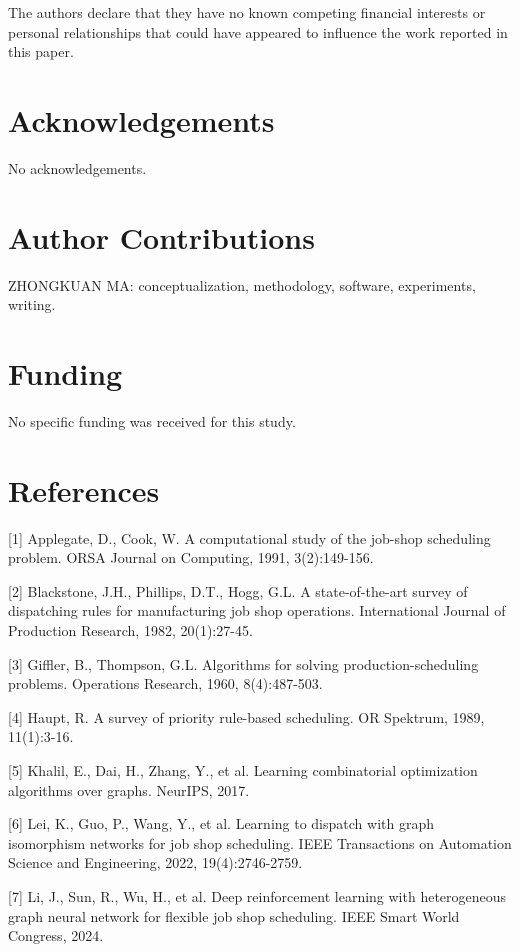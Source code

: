 \documentclass{article}
\begin{document}
The authors declare that they have no known competing financial interests or personal relationships that could have appeared to influence the work reported in this paper.


\section*{Acknowledgements}

No acknowledgements.


\section*{Author Contributions}

ZHONGKUAN MA: conceptualization, methodology, software, experiments, writing.


\section*{Funding}

No specific funding was received for this study.


\section*{References}

{[}1{]} Applegate, D., Cook, W. A computational study of the job-shop scheduling problem. ORSA Journal on Computing, 1991, 3(2):149-156.

{[}2{]} Blackstone, J.H., Phillips, D.T., Hogg, G.L. A state-of-the-art survey of dispatching rules for manufacturing job shop operations. International Journal of Production Research, 1982, 20(1):27-45.

{[}3{]} Giffler, B., Thompson, G.L. Algorithms for solving production-scheduling problems. Operations Research, 1960, 8(4):487-503.

{[}4{]} Haupt, R. A survey of priority rule-based scheduling. OR Spektrum, 1989, 11(1):3-16.

{[}5{]} Khalil, E., Dai, H., Zhang, Y., et al. Learning combinatorial optimization algorithms over graphs. NeurIPS, 2017.

{[}6{]} Lei, K., Guo, P., Wang, Y., et al. Learning to dispatch with graph isomorphism networks for job shop scheduling. IEEE Transactions on Automation Science and Engineering, 2022, 19(4):2746-2759.

{[}7{]} Li, J., Sun, R., Wu, H., et al. Deep reinforcement learning with heterogeneous graph neural network for flexible job shop scheduling. IEEE Smart World Congress, 2024.
\end{document}
